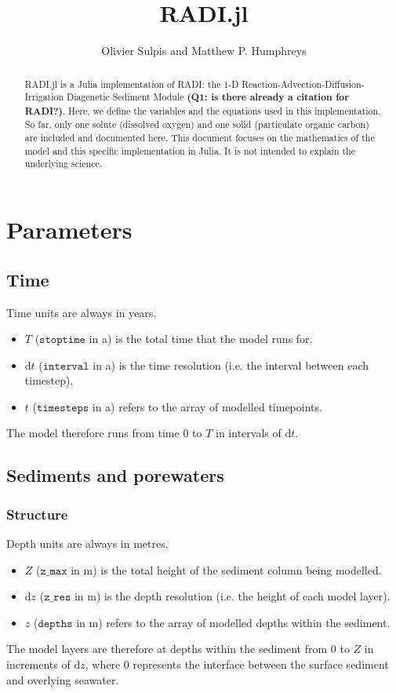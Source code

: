 \documentclass[a4paper]{article}
\newcommand{\D}[1]{\mathrm{d}#1}
\newcommand{\code}[1]{\texttt{#1}}
\newcommand{\wtf}[1]{\textcolor{Cerulean}{\textbf{#1}}}
\begin{document}
\title{RADI.jl}
\author{Olivier Sulpis and Matthew P. Humphreys}

\maketitle

\begin{abstract}
RADI.jl is a Julia implementation of RADI: the 1-D Reaction-Advection-Diffusion-Irrigation Diagenetic Sediment Module \wtf{(Q1: is there already a citation for RADI?)}. Here, we define the variables and the equations used in this implementation. So far, only one solute (dissolved oxygen) and one solid (particulate organic carbon) are included and documented here. This document focuses on the mathematics of the model and this specific implementation in Julia. It is not intended to explain the underlying science.
\end{abstract}

\section{Parameters}

\subsection{Time}

Time units are always in years.
\begin{itemize}
  \item $T$ ($\code{stoptime}$ in a) is the total time that the model runs for.
  \item $\D{t}$ ($\code{interval}$ in a) is the time resolution (i.e. the interval between each timestep).
  \item $t$ ($\code{timesteps}$ in a) refers to the array of modelled timepoints.
\end{itemize}
The model therefore runs from time $0$ to $T$ in intervals of $\D{t}$.

\subsection{Sediments and porewaters}

\subsubsection{Structure}

Depth units are always in metres.
\begin{itemize}
  \item $Z$ ($\code{z\_max}$ in m) is the total height of the sediment column being modelled.
  \item $\D{z}$ ($\code{z\_res}$ in m) is the depth resolution (i.e. the height of each model layer).
  \item $z$ ($\code{depths}$ in m) refers to the array of modelled depths within the sediment.
\end{itemize}
The model layers are therefore at depths within the sediment from $0$ to $Z$ in increments of $\D{z}$, where $0$ represents the interface between the surface sediment and overlying seawater.
\end{document}
